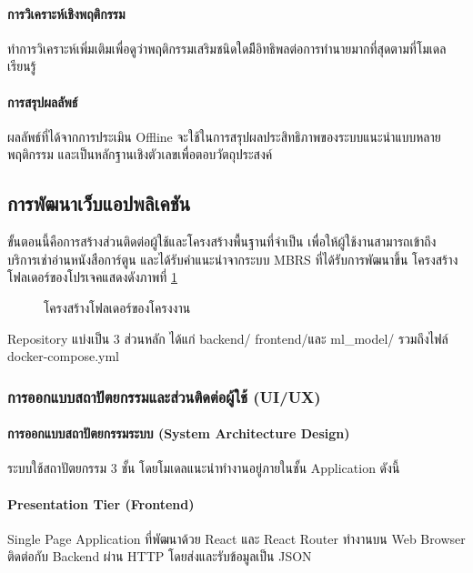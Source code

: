 \paragraph{การวิเคราะห์เชิงพฤติกรรม}
ทำการวิเคราะห์เพิ่มเติมเพื่อดูว่าพฤติกรรมเสริมชนิดใดมีีอิทธิพลต่อการทำนายมากที่สุดตามที่โมเดลเรียนรู้ 

\paragraph{การสรุปผลลัพธ์}
ผลลัพธ์ที่ได้จากการประเมิน Offline จะใช้ในการสรุปผลประสิทธิภาพของระบบแนะนำแบบหลายพฤติกรรม และเป็นหลักฐานเชิงตัวเลขเพื่อตอบวัตถุประสงค์


\subsection{การพัฒนาเว็บแอปพลิเคชัน}

ขั้นตอนนี้คือการสร้างส่วนติดต่อผู้ใช้และโครงสร้างพื้นฐานที่จำเป็น เพื่อให้ผู้ใช้งานสามารถเข้าถึงบริการเช่าอ่านหนังสือการ์ตูน และได้รับคำแนะนำจากระบบ MBRS ที่ได้รับการพัฒนาขึ้น โครงสร้างโฟลเดอร์ของโปรเจคแสดงดังภาพที่ \ref{fig:ch3_project_structure}

\bigskip
\begin{figure}[H]
\centering
\caption{โครงสร้างโฟลเดอร์ของโครงงาน}
\label{fig:ch3_project_structure}
\end{figure}

\noindent Repository แบ่งเป็น 3 ส่วนหลัก ได้แก่ backend/ frontend/และ ml\_model/ รวมถึงไฟล์ docker-compose.yml 

\subsubsection{การออกแบบสถาปัตยกรรมและส่วนติดต่อผู้ใช้ (UI/UX)}
\paragraph{การออกแบบสถาปัตยกรรมระบบ (System Architecture Design)}
ระบบใช้สถาปัตยกรรม 3 ชั้น โดยโมเดลแนะนำทำงานอยู่ภายในชั้น Application ดังนี้

\paragraph{Presentation Tier (Frontend)}
Single Page Application ที่พัฒนาด้วย React และ React Router ทำงานบน Web Browser ติดต่อกับ Backend ผ่าน HTTP โดยส่งและรับข้อมูลเป็น JSON

